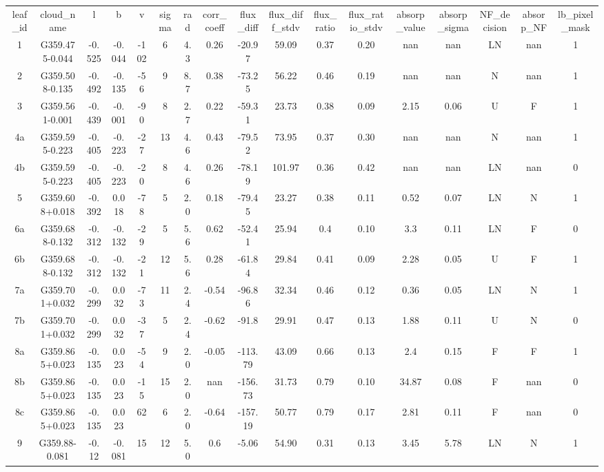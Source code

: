 \begin{table}
\begin{tabular}{ccccccccccccccccc}
leaf_id & cloud_name & l & b & v & sigma & rad & corr_coeff & flux_diff & flux_diff_stdv & flux_ratio & flux_ratio_stdv & absorp_value & absorp_sigma & NF_decision & absorp_NF & lb_pixel_mask \\
1 & G359.475-0.044 & -0.525 & -0.044 & -102 & 6 & 4.3 & 0.26 & -20.97 & 59.09 & 0.37 & 0.20 & nan & nan & LN & nan & 1 \\
2 & G359.508-0.135 & -0.492 & -0.135 & -56 & 9 & 8.7 & 0.38 & -73.25 & 56.22 & 0.46 & 0.19 & nan & nan & N & nan & 1 \\
3 & G359.561-0.001 & -0.439 & -0.001 & -90 & 8 & 2.7 & 0.22 & -59.31 & 23.73 & 0.38 & 0.09 & 2.15 & 0.06 & U & F & 1 \\
4a & G359.595-0.223 & -0.405 & -0.223 & -27 & 13 & 4.6 & 0.43 & -79.52 & 73.95 & 0.37 & 0.30 & nan & nan & N & nan & 1 \\
4b & G359.595-0.223 & -0.405 & -0.223 & -20 & 8 & 4.6 & 0.26 & -78.19 & 101.97 & 0.36 & 0.42 & nan & nan & LN & nan & 0 \\
5 & G359.608+0.018 & -0.392 & 0.018 & -78 & 5 & 2.0 & 0.18 & -79.45 & 23.27 & 0.38 & 0.11 & 0.52 & 0.07 & LN & N & 1 \\
6a & G359.688-0.132 & -0.312 & -0.132 & -29 & 5 & 5.6 & 0.62 & -52.41 & 25.94 & 0.4 & 0.10 & 3.3 & 0.11 & LN & F & 0 \\
6b & G359.688-0.132 & -0.312 & -0.132 & -21 & 12 & 5.6 & 0.28 & -61.84 & 29.84 & 0.41 & 0.09 & 2.28 & 0.05 & U & F & 1 \\
7a & G359.701+0.032 & -0.299 & 0.032 & -73 & 11 & 2.4 & -0.54 & -96.86 & 32.34 & 0.46 & 0.12 & 0.36 & 0.05 & LN & N & 1 \\
7b & G359.701+0.032 & -0.299 & 0.032 & -37 & 5 & 2.4 & -0.62 & -91.8 & 29.91 & 0.47 & 0.13 & 1.88 & 0.11 & U & N & 0 \\
8a & G359.865+0.023 & -0.135 & 0.023 & -54 & 9 & 2.0 & -0.05 & -113.79 & 43.09 & 0.66 & 0.13 & 2.4 & 0.15 & F & F & 1 \\
8b & G359.865+0.023 & -0.135 & 0.023 & -15 & 15 & 2.0 & nan & -156.73 & 31.73 & 0.79 & 0.10 & 34.87 & 0.08 & F & nan & 0 \\
8c & G359.865+0.023 & -0.135 & 0.023 & 62 & 6 & 2.0 & -0.64 & -157.19 & 50.77 & 0.79 & 0.17 & 2.81 & 0.11 & F & nan & 0 \\
9 & G359.88-0.081 & -0.12 & -0.081 & 15 & 12 & 5.0 & 0.6 & -5.06 & 54.90 & 0.31 & 0.13 & 3.45 & 5.78 & LN & N & 1 \\

\end{tabular}
\end{table}

